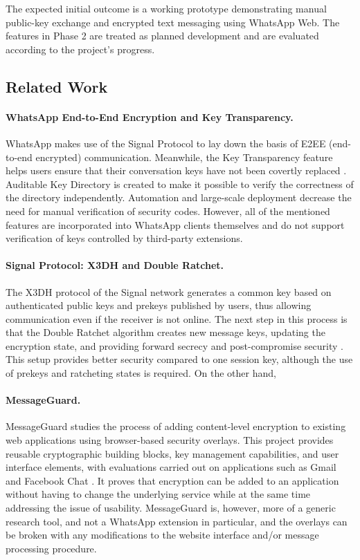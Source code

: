 \documentclass[11pt]{article}
\begin{document}
The expected initial outcome is a working prototype demonstrating manual public-key exchange and encrypted text messaging using WhatsApp Web. The features in Phase 2 are treated as planned development and are evaluated according to the project's progress.


\subsection{Related Work}

\paragraph{WhatsApp End-to-End Encryption and Key Transparency.}

WhatsApp makes use of the Signal Protocol to lay down the basis of E2EE (end-to-end encrypted) communication. Meanwhile, the Key Transparency feature helps users ensure that their conversation keys have not been covertly replaced \cite{whatsapp-e2ee,whatsapp-key-transparency}. Auditable Key Directory is created to make it possible to verify the correctness of the directory independently. Automation and large-scale deployment decrease the need for manual verification of security codes. However, all of the mentioned features are incorporated into WhatsApp clients themselves and do not support verification of keys controlled by third-party extensions.


\paragraph{Signal Protocol: X3DH and Double Ratchet.}
The X3DH protocol of the Signal network generates a common key based on authenticated public keys and prekeys published by users, thus allowing communication even if the receiver is not online. The next step in this process is that the Double Ratchet algorithm creates new message keys, updating the encryption state, and providing forward secrecy and post-compromise security \cite{signal-protocol, signal-double-ratchet}. This setup provides better security compared to one session key, although the use of prekeys and ratcheting states is required. On the other hand, 

\paragraph{MessageGuard.}
MessageGuard studies the process of adding content-level encryption to existing web applications using browser-based security overlays. This project provides reusable cryptographic building blocks, key management capabilities, and user interface elements, with evaluations carried out on applications such as Gmail and Facebook Chat \cite{messageguard}. It proves that encryption can be added to an application without having to change the underlying service while at the same time addressing the issue of usability. MessageGuard is, however, more of a generic research tool, and not a WhatsApp extension in particular, and the overlays can be broken with any modifications to the website interface and/or message processing procedure.
\end{document}

